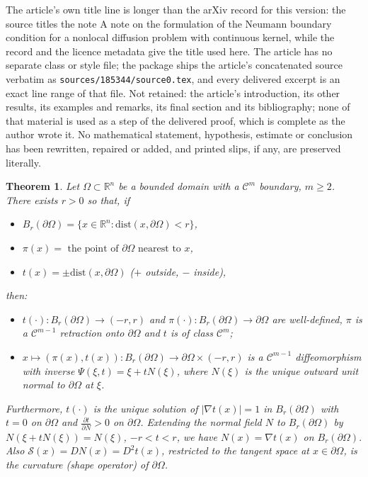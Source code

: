 \documentclass[10pt,a4paper]{amsart}
\theoremstyle{plain}
\newtheorem{theorem}{Theorem}
\newcommand{\R}{\mathbb{R}}
\newcommand{\dist}{\textrm{dist}}
\begin{document}
The article's own title line is longer than the arXiv record for this version: the source titles the note A note on the formulation of the Neumann boundary condition for a nonlocal diffusion problem with continuous kernel, while the record and the licence metadata give the title used here. The article has no separate class or style file; the package ships the article's concatenated source verbatim as \texttt{sources/185344/source0.tex}, and every delivered excerpt is an exact line range of that file. Not retained: the article's introduction, its other results, its examples and remarks, its final section and its bibliography; none of that material is used as a step of the delivered proof, which is complete as the author wrote it. No mathematical statement, hypothesis, estimate or conclusion has been rewritten, repaired or added, and printed slips, if any, are preserved literally.
\begin{theorem} \label{normal_neighborhood}  Let $ \Omega \subset \R^n$ be a {bounded} domain with a $\mathcal{C}^m$ boundary, $ m \geq 2$. There exists $r>0$ so that, if
  \begin{itemize}
  \item $B_r(\partial \Omega)= \{ x \in \R^n : \dist(x, \partial \Omega) < r  \}$,
 \item  $\pi(x) = \textrm{ the point of  }  \partial \Omega
 \textrm{ nearest to  } x  $,
 \item  $  t(x) =  \pm  \dist(x, \partial \Omega)$
  ($+$ outside, $-$ inside),
  \end{itemize}
then:
\begin{itemize}
\item  $ t(\cdot) : B_r(\partial \Omega) \to (-r,r) $ and
 $\pi(\cdot) :  B_r(\partial \Omega) \to \partial \Omega $ are
 well-defined,
 $\pi$ is  a $\mathcal{C}^{m-1} $ retraction onto
  $\partial \Omega$
and $t$ is of class $\mathcal{C}^{m} $;
 \item
$ x \mapsto  (\pi (x), t(x) ) :  B_r(\partial \Omega) \to \partial \Omega \times (-r,r)$  is a  $\mathcal{C}^{m-1} $
 diffeomorphism with inverse
$ \Psi(\xi, t) = \xi + t N(\xi)$,
 where $N(\xi) $ is the unique outward unit normal to $\partial \Omega$
  at $\xi$.
\end{itemize}
 \noindent Furthermore,
 $t(\cdot)$ is the unique solution of
 $| \nabla t(x)| = 1$ in   $B_r(\partial \Omega)$ with $t=0$ on
  $\partial \Omega$ and  $\frac{\partial t }{\partial  N } > 0 $ on  $\partial \Omega$.
  Extending the normal field $N$ to $B_r(\partial \Omega)$ by
$ N(\xi + t N(\xi) )= N(\xi)$, $-r <t < r $, we have
 $ N (x) = \nabla t(x)$  on $B_r (\partial \Omega).$ Also
 $ {\mathcal{S}} (x) = D N (x) = D^2 t(x)$, restricted to the tangent space at $ x  \in \partial \Omega$,  is the curvature {(shape operator)} of $\partial \Omega$.
\end{theorem}
\end{document}
